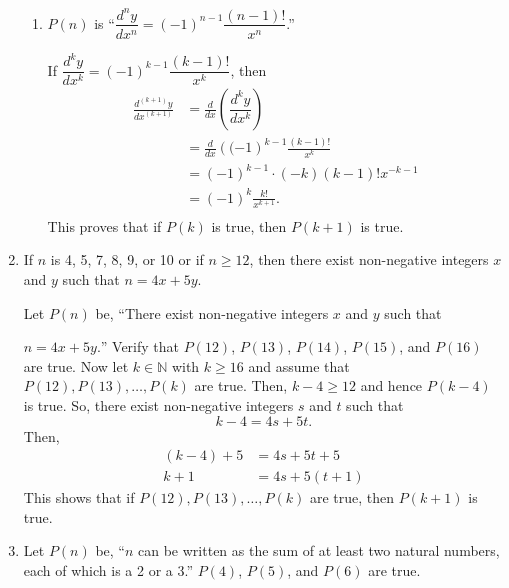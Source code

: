 \begin{enumerate}
\begin{enumerate}
\item $P \left( n \right)$ is 
``$\dfrac{{d^n y}}{{dx^n }} = \left( -1 \right)^{n-1} \dfrac{ \left( n - 1 \right)!}{x^n}$.''

If $\dfrac{{d^k y}}{{dx^k }} = \left( -1 \right)^{k-1} \dfrac{ \left( k - 1 \right)!}{x^k}$, then 
\[
\begin{aligned}
\frac{{d^{(k+1)} y}}{{dx^{(k+1)} }} &= \frac{d}{dx} \left( \dfrac{{d^k y}}{{dx^k }} \right) \\
  &= \frac{d}{dx} \left( ( -1 \right)^{k-1} \frac{ \left( k - 1 \right)!}{x^k} \\
  &=  \left( -1 \right)^{k-1} \cdot \left( -k \right) \left( k - 1 \right)! x^{-k-1} \\
  &=  \left( -1 \right)^k \frac{k!}{x^{k+1}}. \\
\end{aligned}
\]
This proves that if $P \left( k \right)$ is true, then $P \left( k + 1 \right)$ is true.
\end{enumerate}


\item If $n$ is 4, 5, 7, 8, 9, or 10 or if $n \geq 12$, then there exist non-negative integers 
$x$ and $y$ such that $n = 4x + 5y$.

Let $P \left( n \right)$ be, ``There exist non-negative integers $x$ and $y$ such that 

$n = 4x + 5y.$''  Verify that $P \left( 12 \right)$, $P \left( 13 \right)$, $P \left( 14 \right)$, $P \left( 15 \right)$, and $P \left( 16 \right)$ are true.  Now let $k \in \mathbb{N}$ with 
$k \geq 16$ and assume that $P \left( 12 \right), P \left( 13 \right), \ldots, P \left( k \right)$ are true.  Then, $k - 4 \geq 12$ and hence $P \left( k - 4 \right)$ is true.  So, there exist non-negative integers $s$ and $t$ such that
\[
k - 4 = 4s + 5t.
\]
Then,
\begin{align*}
(k - 4) + 5 &= 4s + 5t + 5 \\
     k + 1  &= 4s +5(t + 1)
\end{align*}
This shows that if $P \left( 12 \right), P \left( 13 \right), \ldots, P \left( k \right)$ are true, then  $P \left( k + 1 \right)$ is true.



\item Let $P \left( n \right)$ be, ``$n$ can be written as the sum of at least two natural numbers, each of which is a 2 or a 3.''  $P \left( 4 \right)$, $P \left( 5 \right)$, and 
$P \left( 6 \right)$ are true.


\end{enumerate}
